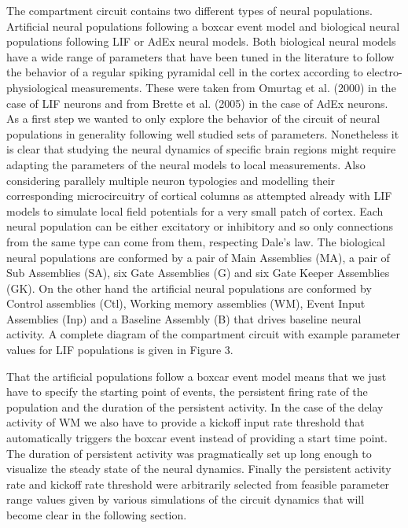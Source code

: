 \documentclass[10pt]{article}
\begin{document}
The compartment circuit contains two different types of neural
populations. Artificial neural populations following a boxcar event
model and biological neural populations following LIF or AdEx neural
models. Both biological neural models have a wide range of parameters
that have been tuned in the literature to follow the behavior of a
regular spiking pyramidal cell in the cortex according to
electro-physiological measurements. These were taken from Omurtag et
al. (2000) \cite{omurtag2000simulation} in the case of LIF neurons and
from Brette et al. (2005) \cite{Brette_2005} in the case of AdEx
neurons. As a first step we wanted to only explore the behavior of the
circuit of neural populations in generality following well studied
sets of parameters. Nonetheless it is clear that studying the neural
dynamics of specific brain regions might require adapting the
parameters of the neural models to local measurements. Also
considering parallely multiple neuron typologies and modelling their
corresponding microcircuitry of cortical columns as attempted already
with LIF models to simulate local field potentials for a very small
patch of cortex\cite{Mazzoni_2015,Hagen_2015}. Each neural population
can be either excitatory or inhibitory and so only connections from
the same type can come from them, respecting Dale's law. The
biological neural populations are conformed by a pair of Main
Assemblies (MA), a pair of Sub Assemblies (SA), six Gate Assemblies
(G) and six Gate Keeper Assemblies (GK). On the other hand the
artificial neural populations are conformed by Control assemblies
(Ctl), Working memory assemblies (WM), Event Input Assemblies (Inp)
and a Baseline Assembly (B) that drives baseline neural activity. A
complete diagram of the compartment circuit with example parameter
values for LIF populations is given in Figure 3.

That the artificial populations follow a boxcar event model means that
we just have to specify the starting point of events, the persistent
firing rate of the population and the duration of the persistent
activity. In the case of the delay activity of WM we also have to
provide a kickoff input rate threshold that automatically triggers the
boxcar event instead of providing a start time point. The duration of
persistent activity was pragmatically set up long enough to visualize
the steady state of the neural dynamics. Finally the persistent
activity rate and kickoff rate threshold were arbitrarily selected
from feasible parameter range values given by various simulations of
the circuit dynamics that will become clear in the following section.
\end{document}
